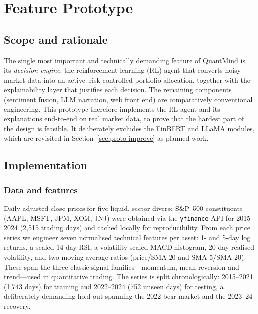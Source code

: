 \chapter{Feature Prototype}
\label{ch:prototype}

\section{Scope and rationale}
The single most important and technically demanding feature of QuantMind is its
\emph{decision engine}: the reinforcement-learning (RL) agent that converts noisy
market data into an active, risk-controlled portfolio allocation, together with
the explainability layer that justifies each decision. The remaining components
(sentiment fusion, LLM narration, web front end) are comparatively conventional
engineering. This prototype therefore implements the RL agent and its
explanations end-to-end on real market data, to prove that the hardest part of
the design is feasible. It deliberately excludes the FinBERT and LLaMA modules,
which are revisited in Section~\ref{sec:proto-improve} as planned work.

\section{Implementation}

\subsection{Data and features}
Daily adjusted-close prices for five liquid, sector-diverse S\&P~500 constituents
(AAPL, MSFT, JPM, XOM, JNJ) were obtained via the \texttt{yfinance} API
\cite{yfinance} for 2015--2024 (2{,}515 trading days) and cached locally for
reproducibility. From each price series we engineer seven normalised technical
features per asset: 1- and 5-day log returns, a scaled 14-day RSI, a
volatility-scaled MACD histogram, 20-day realised volatility, and two
moving-average ratios (price/SMA-20 and SMA-5/SMA-20). These span the three
classic signal families---momentum, mean-reversion and trend---used in
quantitative trading. The series is split chronologically: 2015--2021 (1{,}743
days) for training and 2022--2024 (752 unseen days) for testing, a deliberately
demanding hold-out spanning the 2022 bear market and the 2023--24 recovery.

